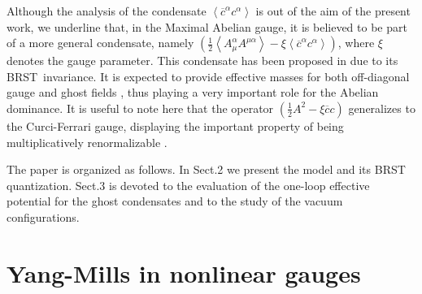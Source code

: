 \documentclass[a4paper,12pt]{article}
\begin{document}
Although the analysis of the condensate $\left\langle \overline{c}^{\alpha
}c^{\alpha }\right\rangle $ is out of the aim of the present work, we
underline that, in the Maximal Abelian gauge, it is believed to be part of a
more general condensate, namely $\left( \frac{1}{2}\left\langle A_{\mu
}^{\alpha }A^{\mu \alpha }\right\rangle -\xi \left\langle \overline{c}%
^{\alpha }c^{\alpha }\right\rangle \right) $, where $\xi $ denotes the gauge
parameter. This condensate has been proposed in \cite{ope} due to its BRST\
invariance. It is expected to provide effective masses for both off-diagonal
gauge and ghost fields \cite{dd,ope}, thus playing a very important role for
the Abelian dominance. It is useful to note here that the operator $\left( 
\frac{1}{2}A^{2}-\xi \overline{c}c\right) $ generalizes to the Curci-Ferrari
gauge, displaying the important property of being multiplicatively
renormalizable \cite{mr,mr1}.

The paper is organized as follows. In Sect.2 we present the model and its
BRST quantization. Sect.3 is devoted to the evaluation of the one-loop
effective potential for the ghost condensates and to the study of the vacuum
configurations.

\section{Yang-Mills in nonlinear gauges}
\end{document}
